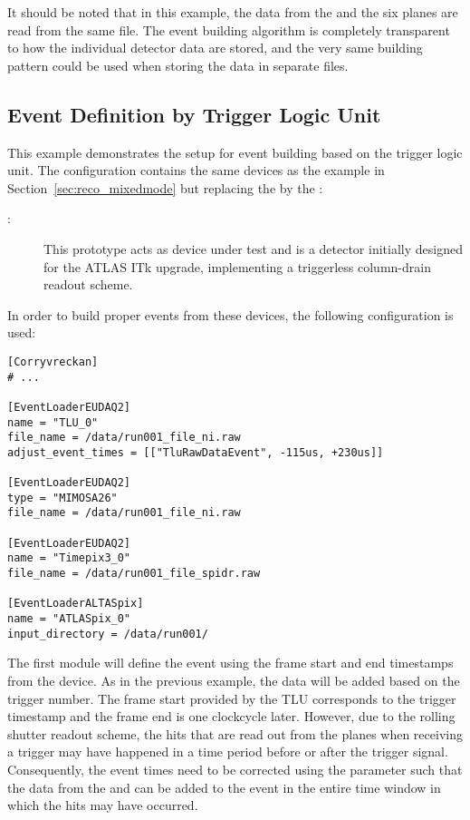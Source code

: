 It should be noted that in this example, the data from the  and the six  planes are read from the same file.
The event building algorithm is completely transparent to how the individual detector data are stored, and the very same building pattern could be used when storing the data in separate files.



\subsection{Event Definition by Trigger Logic Unit}
This example demonstrates the setup for event building based on the trigger logic unit.
The configuration contains the same devices as the example in Section~\ref{sec:reco_mixedmode} but replacing the  by the :
\begin{description}
        \item[:] This prototype acts as device under test and is a detector initially designed for the ATLAS ITk upgrade, implementing a triggerless column-drain readout scheme.
\end{description}

In order to build proper events from these devices, the following configuration is used:

\begin{verbatim}
[Corryvreckan]
# ...

[EventLoaderEUDAQ2]
name = "TLU_0"
file_name = /data/run001_file_ni.raw
adjust_event_times = [["TluRawDataEvent", -115us, +230us]]

[EventLoaderEUDAQ2]
type = "MIMOSA26"
file_name = /data/run001_file_ni.raw

[EventLoaderEUDAQ2]
name = "Timepix3_0"
file_name = /data/run001_file_spidr.raw

[EventLoaderALTASpix]
name = "ATLASpix_0"
input_directory = /data/run001/
\end{verbatim}

The first module will define the event using the frame start and end timestamps from the  device.
As in the previous example, the  data will be added based on the trigger number.
The frame start provided by the TLU corresponds to the trigger timestamp and the frame end is one clockcycle later.
However, due to the rolling shutter readout scheme, the hits that are read out from the  planes when receiving a trigger may have happened in a time period before or after the trigger signal.
Consequently, the event times need to be corrected using the  parameter such that the data from the  and  can be added to the event in the entire time window in which the  hits may have occurred.
